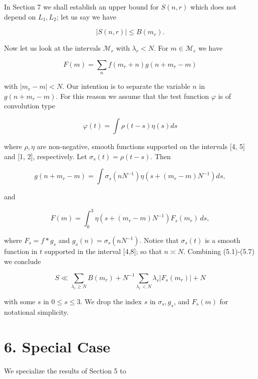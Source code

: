 \documentclass[10pt]{article}
\begin{document}
In Section 7 we shall establish an upper bound for $S(n, r)$ which does not depend on $L_{1}, L_{2}$; let us say we have


\begin{equation*}
|S(n, r)| \leqslant B\left(m_{r}\right) . \tag{5.6}
\end{equation*}


Now let us look at the intervals $\mathscr{M}_{r}$ with $\lambda_{r}<N$. For $m \in \mathscr{M}_{r}$ we have

$$
F(m)=\sum_{n} f\left(m_{r}+n\right) g\left(n+m_{r}-m\right)
$$

with $\left|m_{r}-m\right|<N$. Our intention is to separate the variable $n$ in $g\left(n+m_{r}-m\right)$. For this reason we assume that the test function $\varphi$ is of convolution type

$$
\varphi(t)=\int \rho(t-s) \eta(s) d s
$$

where $\rho, \eta$ are non-negative, smooth functions supported on the intervals [4, 5] and [1, 2], respectively. Let $\sigma_{s}(t)=\rho(t-s)$. Then

$$
g\left(n+m_{r}-m\right)=\int \sigma_{s}\left(n N^{-1}\right) \eta\left(s+\left(m_{r}-m\right) N^{-1}\right) d s,
$$

and


\begin{equation*}
F(m)=\int_{0}^{3}\eta\left(s+(m_{r}-m)N^{-1}\right)F_{s}(m_{r})\,ds, \tag{5.7}
\end{equation*}


where $F_{s}=f * g_{s}$ and $g_{s}(n)=\sigma_{s}\left(n N^{-1}\right)$. Notice that $\sigma_{s}(t)$ is a smooth function in $t$ supported in the interval [4,8]; so that $n \asymp N$. Combining (5.1)-(5.7) we conclude


\begin{equation*}
S \ll \sum_{\lambda_{r} \geqslant N} B\left(m_{r}\right)+N^{-1} \sum_{\lambda_{r}<N} \lambda_{r}\left|F_{s}\left(m_{r}\right)\right|+N \tag{5.8}
\end{equation*}


with some $s$ in $0 \leqslant s \leqslant 3$.
We drop the index $s$ in $\sigma_{s}, g_{s}$, and $F_{s}(m)$ for notational simplicity.

\section*{6. Special Case}
We specialize the results of Section 5 to
\end{document}
